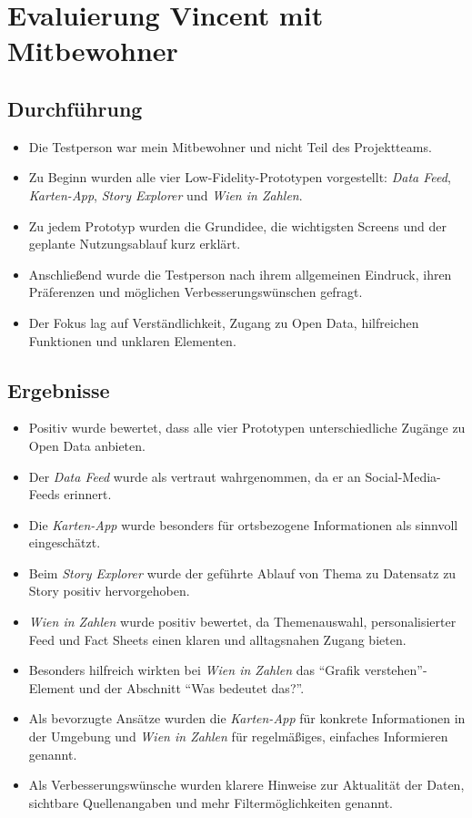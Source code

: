 \section{Evaluierung Vincent mit Mitbewohner}

\subsection{Durchf\"uhrung}

\begin{itemize}
    \item Die Testperson war mein Mitbewohner und nicht Teil des Projektteams.
    \item Zu Beginn wurden alle vier Low-Fidelity-Prototypen vorgestellt: \textit{Data Feed}, \textit{Karten-App}, \textit{Story Explorer} und \textit{Wien in Zahlen}.
    \item Zu jedem Prototyp wurden die Grundidee, die wichtigsten Screens und der geplante Nutzungsablauf kurz erkl\"art.
    \item Anschlie{\ss}end wurde die Testperson nach ihrem allgemeinen Eindruck, ihren Pr\"aferenzen und m\"oglichen Verbesserungsw\"unschen gefragt.
    \item Der Fokus lag auf Verst\"andlichkeit, Zugang zu Open Data, hilfreichen Funktionen und unklaren Elementen.
\end{itemize}

\subsection{Ergebnisse}

\begin{itemize}
    \item Positiv wurde bewertet, dass alle vier Prototypen unterschiedliche Zug\"ange zu Open Data anbieten.
    \item Der \textit{Data Feed} wurde als vertraut wahrgenommen, da er an Social-Media-Feeds erinnert.
    \item Die \textit{Karten-App} wurde besonders f\"ur ortsbezogene Informationen als sinnvoll eingesch\"atzt.
    \item Beim \textit{Story Explorer} wurde der gef\"uhrte Ablauf von Thema zu Datensatz zu Story positiv hervorgehoben.
    \item \textit{Wien in Zahlen} wurde positiv bewertet, da Themenauswahl, personalisierter Feed und Fact Sheets einen klaren und alltagsnahen Zugang bieten.
    \item Besonders hilfreich wirkten bei \textit{Wien in Zahlen} das ``Grafik verstehen''-Element und der Abschnitt ``Was bedeutet das?''.
    \item Als bevorzugte Ans\"atze wurden die \textit{Karten-App} f\"ur konkrete Informationen in der Umgebung und \textit{Wien in Zahlen} f\"ur regelm\"a{\ss}iges, einfaches Informieren genannt.
    \item Als Verbesserungsw\"unsche wurden klarere Hinweise zur Aktualit\"at der Daten, sichtbare Quellenangaben und mehr Filterm\"oglichkeiten genannt.
\end{itemize}